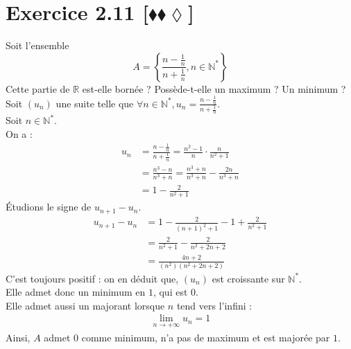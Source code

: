 \documentclass[10pt]{article}
\begin{document}

\section*{Exercice 2.11 [$\blacklozenge\blacklozenge\lozenge$]}
\begin{tcolorbox}[enhanced, width=7in, center, size=fbox, fontupper=\large, drop shadow southwest]
    Soit l'ensemble 
    \begin{equation*}
        A = \left\{\frac{ n-\frac{1}{n} }{ n+\frac{1}{n}}, n\in\mathbb{N}^* \right\}
    \end{equation*}
    Cette partie de $\mathbb{R}$ est-elle bornée ? Possède-t-elle un maximum ? Un minimum ?\\
    Soit $(u_n)$ une suite telle que $\forall{n\in\mathbb{N}^*}, u_n=\frac{n-\frac{1}{n}}{n+\frac{1}{n}}$.\\
    Soit $n\in\mathbb{N}^*$.\\
    On a :
    \begin{align*}
        u_n 
        &= \frac{n-\frac{1}{n}}{n+\frac{1}{n}} = \frac{n^2-1}{n} \cdot \frac{n}{n^2+1}\\
        &= \frac{n^3-n}{n^3+n} = \frac{n^3+n}{n^3+n}-\frac{2n}{n^3+n}\\
        &= 1 - \frac{2}{n^2+1}
    \end{align*}
    Étudions le signe de $u_{n+1}-u_n$.
    \begin{align*}
        u_{n+1}-u_n
        &= 1 - \frac{2}{(n+1)^2+1}-1+\frac{2}{n^2+1}\\
        &= \frac{2}{n^2+1} - \frac{2}{n^2+2n+2}\\
        &= \frac{4n+2}{(n^2)(n^2+2n+2)}
    \end{align*}
    C'est toujours positif : on en déduit que, $(u_n)$ est croissante sur $\mathbb{N}^*$.\\
    Elle admet donc un minimum en $1$, qui est $0$.\\
    Elle admet aussi un majorant lorsque $n$ tend vers l'infini :
    \begin{align*}
        \lim_{n\rightarrow+\infty}u_n=1
    \end{align*}
    Ainsi, $A$ admet $0$ comme minimum, n'a pas de maximum et est majorée par $1$.
\end{tcolorbox}
\end{document}

